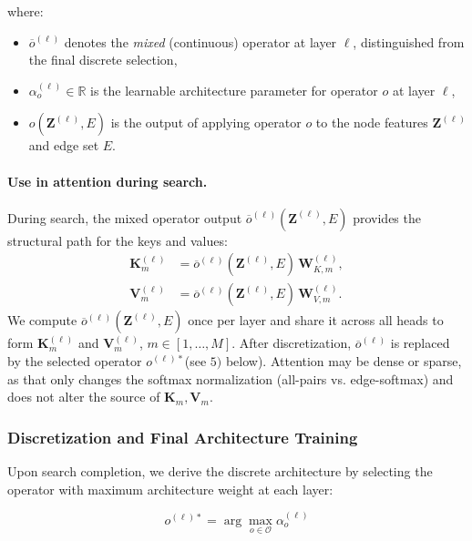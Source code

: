 \documentclass[lettersize,journal]{IEEEtran}
\begin{document}
where:
\begin{itemize}
    \item $\overline{o}^{(\ell)}$ denotes the \emph{mixed} (continuous) operator at layer $\ell$, distinguished from the final discrete selection,
    \item $\alpha_o^{(\ell)} \in \mathbb{R}$ is the learnable architecture parameter for operator $o$ at layer $\ell$,
    \item $o(\mathbf{Z}^{(\ell)}, E)$ is the output of applying operator $o$ to the node features $\mathbf{Z}^{(\ell)}$ and edge set $E$.
\end{itemize}

\paragraph{Use in attention during search.}
During search, the mixed operator output $\overline{o}^{(\ell)}(\mathbf{Z}^{(\ell)},E)$ provides the structural path for the keys and values:
\begin{subequations}
\begin{align}
\mathbf{K}_{m}^{(\ell)} &= \overline{o}^{(\ell)}(\mathbf{Z}^{(\ell)},E)\,\mathbf{W}_{K,m}^{(\ell)},\\
\mathbf{V}_{m}^{(\ell)} &= \overline{o}^{(\ell)}(\mathbf{Z}^{(\ell)},E)\,\mathbf{W}_{V,m}^{(\ell)}.
\end{align}
\end{subequations}
We compute $\overline{o}^{(\ell)}(\mathbf{Z}^{(\ell)},E)$ once per layer and share it across all heads to form $\mathbf{K}_{m}^{(\ell)}$ and $\mathbf{V}_{m}^{(\ell)}$, $m \in [1,\dots, M]$.
After discretization, $\overline{o}^{(\ell)}$ is replaced by the selected operator $o^{(\ell)*}$(see $\textit{5)}$ below).
Attention may be dense or sparse, as that only changes the softmax normalization (all-pairs vs. edge-softmax) and does not alter the source of $\mathbf{K}_{m},\mathbf{V}_{m}$.



\subsubsection{Discretization and Final Architecture Training}
\label{subsection:discrete}
Upon search completion, we derive the discrete architecture by selecting the operator with maximum architecture weight at each layer:

\begin{equation}
o^{(\ell)*} = \arg\max_{o \in \mathcal{O}} \alpha_o^{(\ell)}
\end{equation}
\end{document}
